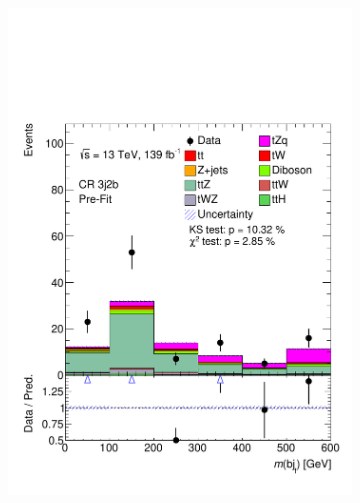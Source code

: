  
\begin{figure}[!h]
  \begin{subfigure}[b]{0.33\linewidth}
    \centering
    \includegraphics[width=\linewidth]{ubonn-thesis/Chapters/Chapters_06/Figure/Input_distribution/CR_3j2b_M_bj.pdf} 
  \end{subfigure}%
  \begin{subfigure}[b]{0.33\linewidth}
    \centering

\end{subfigure}
\end{figure}
